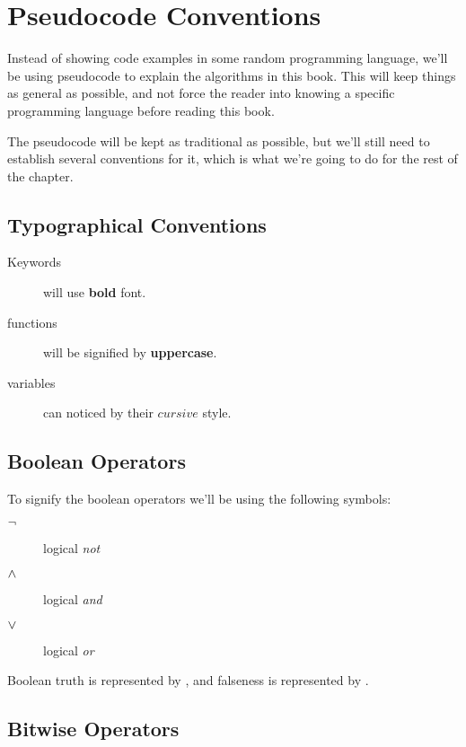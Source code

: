 \chapter{Pseudocode Conventions}
\label{cha:pseudocode-convent}

Instead of showing code examples in some random programming language,
we'll be using pseudocode to explain the algorithms in this book. This
will keep things as general as possible, and not force the reader into
knowing a specific programming language before reading this book.


The pseudocode will be kept as traditional as possible, but we'll
still need to establish several conventions for it, which is what
we're going to do for the rest of the chapter.

\section{Typographical Conventions}

\begin{description}
\item[Keywords] will use \textbf{bold} font.
\item[functions] will be signified by \textbf{uppercase}.
\item[variables] can noticed by their $cursive$ style.
\end{description}

\section{Boolean Operators}
\label{sec:boolean-operators}

To signify the boolean operators we'll be using the following
symbols:

\begin{description}
\item[$\neg$] logical \textit{not}
\item[$\wedge$] logical \textit{and}
\item[$\vee$] logical \textit{or}
\end{description}

Boolean truth is represented by \True{}, and falseness is represented by
\False{}.

\section{Bitwise Operators}
\label{sec:bitwise-operators}


